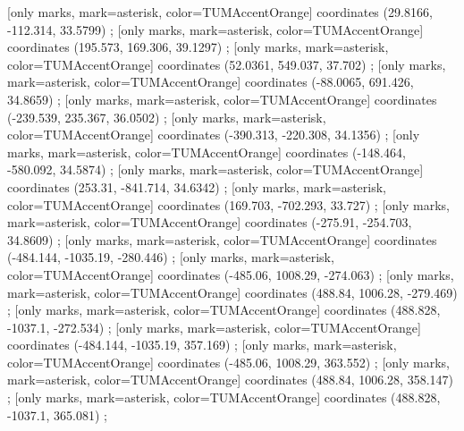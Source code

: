         [only marks, mark=asterisk, color=TUMAccentOrange] coordinates { (29.8166, -112.314, 33.5799) };
        [only marks, mark=asterisk, color=TUMAccentOrange] coordinates { (195.573, 169.306, 39.1297) };
        [only marks, mark=asterisk, color=TUMAccentOrange] coordinates { (52.0361, 549.037, 37.702) };
        [only marks, mark=asterisk, color=TUMAccentOrange] coordinates { (-88.0065, 691.426, 34.8659) };
        [only marks, mark=asterisk, color=TUMAccentOrange] coordinates { (-239.539, 235.367, 36.0502) };
        [only marks, mark=asterisk, color=TUMAccentOrange] coordinates { (-390.313, -220.308, 34.1356) };
        [only marks, mark=asterisk, color=TUMAccentOrange] coordinates { (-148.464, -580.092, 34.5874) };
        [only marks, mark=asterisk, color=TUMAccentOrange] coordinates { (253.31, -841.714, 34.6342) };
        [only marks, mark=asterisk, color=TUMAccentOrange] coordinates { (169.703, -702.293, 33.727) };
        [only marks, mark=asterisk, color=TUMAccentOrange] coordinates { (-275.91, -254.703, 34.8609) };
        [only marks, mark=asterisk, color=TUMAccentOrange] coordinates { (-484.144, -1035.19, -280.446) };
        [only marks, mark=asterisk, color=TUMAccentOrange] coordinates { (-485.06, 1008.29, -274.063) };
        [only marks, mark=asterisk, color=TUMAccentOrange] coordinates { (488.84, 1006.28, -279.469) };
        [only marks, mark=asterisk, color=TUMAccentOrange] coordinates { (488.828, -1037.1, -272.534) };
        [only marks, mark=asterisk, color=TUMAccentOrange] coordinates { (-484.144, -1035.19, 357.169) };
        [only marks, mark=asterisk, color=TUMAccentOrange] coordinates { (-485.06, 1008.29, 363.552) };
        [only marks, mark=asterisk, color=TUMAccentOrange] coordinates { (488.84, 1006.28, 358.147) };
        [only marks, mark=asterisk, color=TUMAccentOrange] coordinates { (488.828, -1037.1, 365.081) };
